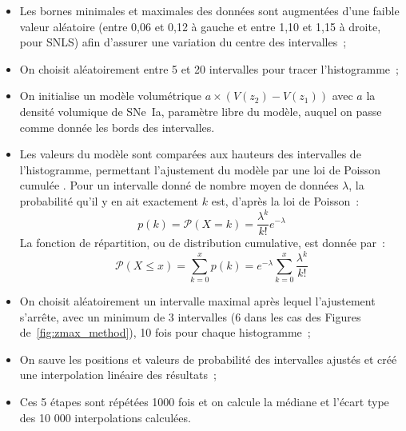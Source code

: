 \documentclass[../main/main.tex]{subfiles}
\begin{document}
\begin{itemize}
    \item Les bornes minimales et maximales des données sont augmentées d'une
        faible valeur aléatoire (entre 0,06 et 0,12 à gauche et entre 1,10 et
        1,15 à droite, pour SNLS) afin d'assurer une variation du centre des
        intervalles~;
    \item On choisit aléatoirement entre 5 et 20 intervalles pour tracer
        l'histogramme~;
    \item On initialise un modèle volumétrique $a\times
        \left(V(z_2)-V(z_1)\right)$ avec $a$ la densité volumique de SNe~Ia,
        paramètre libre du modèle, auquel on passe comme donnée les bords des
        intervalles.
    \item Les valeurs du modèle sont comparées aux hauteurs des intervalles de
        l'histogramme, permettant l'ajustement du modèle par une loi de Poisson
        cumulée \citep[voir par exemple][]{syed2015}. Pour un intervalle donné
        de nombre moyen de données $\lambda$, la probabilité qu'il y en ait
        exactement $k$ est, d'après la loi de Poisson~:
        \begin{equation}\label{eq:poisson}
            p(k) = \mathcal{P}(X = k) = \frac{\lambda^k}{k!}e^{-\lambda}
        \end{equation}
        La fonction de répartition, ou de distribution cumulative, est donnée
        par~:
        \begin{equation}\label{eq:pcdf}
            \mathcal{P}(X\leq x) = \sum_{k=0}^{x}p(k) = e^{-\lambda}
            \sum_{k=0}^{x} \frac{\lambda^k}{k!}
        \end{equation}
    \item On choisit aléatoirement un intervalle maximal après lequel
        l'ajustement s'arrête, avec un minimum de 3 intervalles (6 dans les cas
        des Figures de~\ref{fig:zmax_method}), 10 fois pour chaque histogramme~;
    \item On sauve les positions et valeurs de probabilité des intervalles
        ajustés et créé une interpolation linéaire des résultats~;
    \item Ces 5 étapes sont répétées 1000 fois et on calcule la médiane et
        l'écart type des 10 000 interpolations calculées.
\end{itemize}
\end{document}
